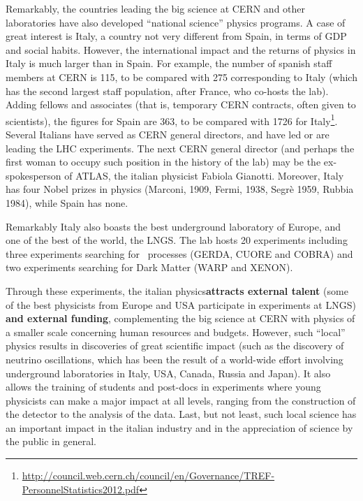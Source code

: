 Remarkably, the countries leading the big science at CERN and other laboratories have also developed ``national science'' physics programs. A case of great interest is Italy, a country not very different from Spain, in terms of GDP and social habits. However, the international impact and the returns of physics in Italy is much larger than in Spain. For example, the number of spanish staff members at CERN is 115, to be compared with 275 corresponding to Italy (which has the second largest staff population, after France, who co-hosts the lab). Adding fellows and associates (that is, temporary CERN contracts, often given to scientists), the figures for Spain are 363, to be compared with 1726 for Italy\footnote{\href{http://council.web.cern.ch/council/en/Governance/TREF-PersonnelStatistics2012.pdf}{http://council.web.cern.ch/council/en/Governance/TREF-PersonnelStatistics2012.pdf}}. Several Italians have served as CERN general directors, and have led or are leading the LHC experiments. The next CERN general director (and perhaps the first woman to occupy such position in the history of the lab) may be the ex-spokesperson of ATLAS, the italian physicist Fabiola Gianotti. Moreover, Italy has four Nobel prizes in physics (Marconi, 1909, Fermi, 1938, Segrè 1959, Rubbia 1984), while Spain has none. 

Remarkably Italy also boasts the best underground laboratory of Europe, and one of the best of the world, the LNGS. The lab hosts 20 experiments including three experiments searching for \bbonu\ processes (GERDA, CUORE and COBRA) and two experiments searching for Dark Matter (WARP and XENON). 

Through these experiments, the italian physics{\bf attracts external talent} (some of the best physicists from Europe and USA participate in experiments at LNGS) {\bf and external funding}, complementing the big science at CERN with physics of a smaller scale concerning human resources and budgets. However, such ``local'' physics results in discoveries of great scientific impact (such as the discovery of neutrino oscillations, which has been the result of a world-wide effort involving underground laboratories in Italy, USA, Canada, Russia and Japan). It also allows the training of students and post-docs in experiments where young physicists can make a major impact at all levels, ranging from the construction of the detector to the analysis of the data. Last, but not least, such local science has an important impact in the italian industry and in the appreciation of science by the public in general. 

